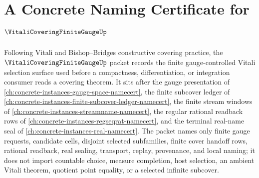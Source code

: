 \chapter{A Concrete Naming Certificate for $\VitaliCoveringFiniteGaugeUp$}
\label{ch:concrete-instances-vitali-covering-finite-gauge-namecert}

Following Vitali and Bishop--Bridges constructive covering practice, the $\VitaliCoveringFiniteGaugeUp$ packet records the finite gauge-controlled Vitali selection surface used before a compactness, differentiation, or integration consumer reads a covering theorem. It sits after the gauge presentation of \autoref{ch:concrete-instances-gauge-space-namecert}, the finite subcover ledger of \autoref{ch:concrete-instances-finite-subcover-ledger-namecert}, the finite stream windows of \autoref{ch:concrete-instances-streamname-namecert}, the regular rational readback rows of \autoref{ch:concrete-instances-regseqrat-namecert}, and the terminal real-name seal of \autoref{ch:concrete-instances-real-namecert}. The packet names only finite gauge requests, candidate cells, disjoint selected subfamilies, finite cover handoff rows, rational readback, real sealing, transport, replay, provenance, and local naming; it does not import countable choice, measure completion, host selection, an ambient Vitali theorem, quotient point equality, or a selected infinite subcover.

